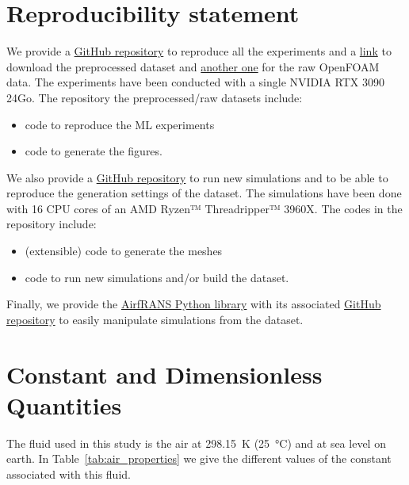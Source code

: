 \begin{subappendices}	
	\section{Reproducibility statement}
	
	We provide a  \href{https://github.com/Extrality/AirfRANS}{GitHub repository} to reproduce all the experiments and a \href{https://data.isir.upmc.fr/extrality/NeurIPS_2022/Dataset.zip}{link} to download the preprocessed dataset and \href{https://data.isir.upmc.fr/extrality/NeurIPS_2022/OF_dataset.zip}{another one} for the raw OpenFOAM data. The experiments have been conducted with a single NVIDIA RTX 3090 24Go. The repository the preprocessed/raw datasets include:
	\begin{itemize}
		\item code to reproduce the ML experiments
		\item code to generate the figures.
	\end{itemize}
	
	We also provide a \href{https://github.com/Extrality/NACA_simulation}{GitHub repository} to run new simulations and to be able to reproduce the generation settings of the dataset. The simulations have been done with 16 CPU cores of an AMD Ryzen™ Threadripper™ 3960X. The codes in the repository include:
	\begin{itemize}
		\item (extensible) code to generate the meshes
		\item code to run new simulations and/or build the dataset.
	\end{itemize}
	
	Finally, we provide the \href{https://airfrans.readthedocs.io/en/latest/index.html}{AirfRANS Python library} with its associated \href{https://github.com/Extrality/airfrans_lib}{GitHub repository} to easily manipulate simulations from the dataset.
	
	\section{Constant and Dimensionless Quantities}\label{ap:dimensionless}
	The fluid used in this study is the air at \SI{298.15}{\kelvin} (\SI{25}{\celsius}) and at sea level on earth. In Table~\ref{tab:air_properties} we give the different values of the constant associated with this fluid.
	

\end{subappendices}
